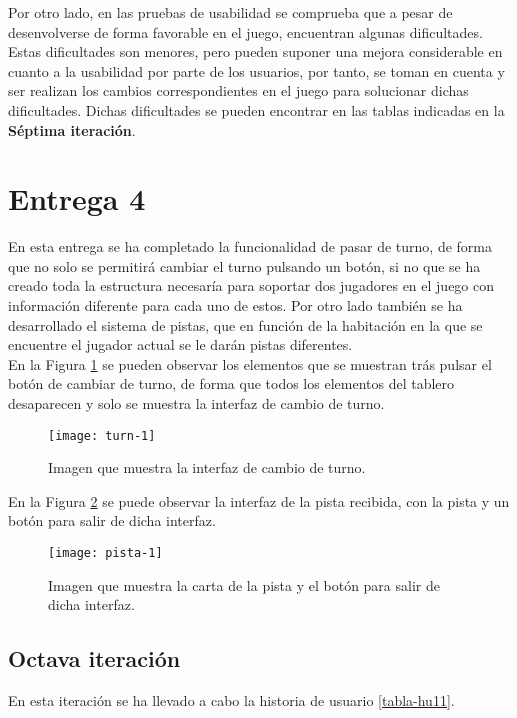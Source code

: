 \begin{itemize}
Por otro lado, en las pruebas de usabilidad se comprueba que a pesar de desenvolverse de forma favorable en el juego, encuentran algunas dificultades. Estas dificultades son menores, pero pueden suponer una mejora considerable en cuanto a la usabilidad por parte de los usuarios, por tanto, se toman en cuenta y ser realizan los cambios correspondientes en el juego para solucionar dichas dificultades. Dichas dificultades se pueden encontrar en las tablas indicadas en la \textbf{Séptima iteración}.

\section{Entrega 4}
En esta entrega se ha completado la funcionalidad de pasar de turno, de forma que no solo se permitirá cambiar el turno pulsando un botón, si no que se ha creado toda la estructura necesaría para soportar dos jugadores en el juego con información diferente para cada uno de estos. Por otro lado también se ha desarrollado el sistema de pistas, que en función de la habitación en la que se encuentre el jugador actual se le darán pistas diferentes.\\

En la Figura \ref{figura-turn-1} se pueden observar los elementos que se muestran trás pulsar el botón de cambiar de turno, de forma que todos los elementos del tablero desaparecen y solo se muestra la interfaz de cambio de turno.

\begin{figure}[h]
  \centering
  \texttt{[image: turn-1]}
  \caption{Imagen que muestra la interfaz de cambio de turno.}
  \label{figura-turn-1}
\end{figure}

\newpage

En la Figura \ref{figura-pista-1} se puede observar la interfaz de la pista recibida, con la pista y un botón para salir de dicha interfaz.

\begin{figure}[h]
  \centering
  \texttt{[image: pista-1]}
  \caption{Imagen que muestra la carta de la pista y el botón para salir de dicha interfaz.}
  \label{figura-pista-1}
\end{figure}


\subsection{Octava iteración}
En esta iteración se ha llevado a cabo la historia de usuario \ref{tabla-hu11}.\\


\end{itemize}
